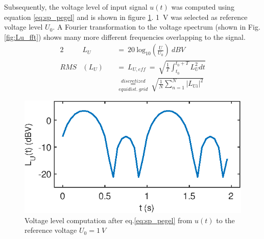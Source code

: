 \subsubsection{}
Subsequently, the voltage level of input signal $u(t)$ was computed using equation \ref{eq:sp_pegel} and is shown in figure \ref{fig:Lu_sig}. \SI{1}{V} was selected as reference voltage level $U_0$. A Fourier transformation to the voltage spectrum (shown in Fig. \ref{fig:Lu_fft}) shows many more different frequencies overlapping to the signal.
\begin{alignat}{2}
    &L_U\ &&=\ 20\ \mathrm{log}_{10}\left(\frac{U}{U_0}\right)\ \si{dBV} \label{eq:sp_pegel}\\
    RMS&(L_U)\ &&=\ L_{U,eff}\ =\ \sqrt{\frac{1}{T}\int_{t_0}^{t_0+T}L_U^2dt} \label{eq:RMS_cont} \\
    &&&\underset{equidist.\ grid}{\overset{discretized}{=}}\ \sqrt{\frac{1}{N}\sum_{n=1}^{N}|L_{Ui}|^2} \label{eq:RMS}
\end{alignat}
\begin{figure}[h] 
  \centering
  \includegraphics[scale=1]{ue1/L_U_sig.eps} %
  \caption{Voltage level computation after eq.\ref{eq:sp_pegel} from $u(t)$ to the reference voltage $U_0=\SI{1}{V}$}
  \label{fig:Lu_sig}
\end{figure}

